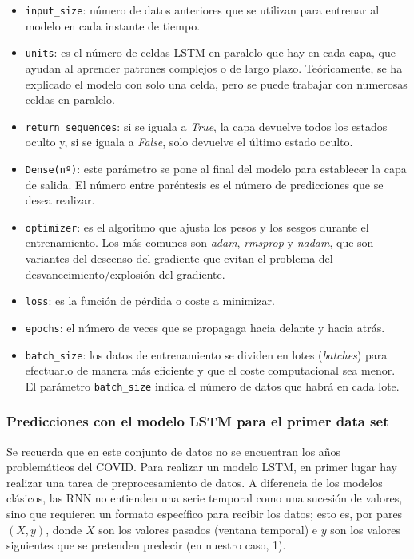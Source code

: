 \documentclass[12pt,twoside]{article}
\begin{document}
\begin{itemize}
    \item \texttt{input\_size}: número de datos anteriores que se utilizan para entrenar al modelo en cada instante de tiempo.
    \item \texttt{units}: es el número de celdas LSTM en paralelo que hay en cada capa, que ayudan al aprender patrones complejos o de largo plazo. Teóricamente, se ha explicado el modelo con solo una celda, pero se puede trabajar con numerosas celdas en paralelo.
    \item \texttt{return\_sequences}: si se iguala a \textit{True}, la capa devuelve todos los estados oculto y, si se iguala a \textit{False}, solo devuelve el último estado oculto.
    \item \texttt{Dense(nº)}: este parámetro se pone al final del modelo para establecer la capa de salida. El número entre paréntesis es el número de predicciones que se desea realizar.
    \item \texttt{optimizer}: es el algoritmo que ajusta los pesos y los sesgos durante el entrenamiento. Los más comunes son \textit{adam}, \textit{rmsprop} y \textit{nadam}, que son variantes del descenso del gradiente que evitan el problema del desvanecimiento/explosión del gradiente.
    \item \texttt{loss}: es la función de pérdida o coste a minimizar.
    \item \texttt{epochs}: el número de veces que se propagaga hacia delante y hacia atrás.
    \item \texttt{batch\_size}: los datos de entrenamiento se dividen en lotes (\textit{batches}) para efectuarlo de manera más eficiente y que el coste computacional sea menor. El parámetro \texttt{batch\_size} indica el número de datos que habrá en cada lote.
\end{itemize}

\subsubsection{Predicciones con el modelo LSTM para el primer data set}\label{sec:19}

Se recuerda que en este conjunto de datos no se encuentran los años problemáticos del COVID. Para realizar un modelo LSTM, en primer lugar hay realizar una tarea de preprocesamiento de datos. A diferencia de los modelos clásicos, las RNN no entienden una serie temporal como una sucesión de valores, sino que requieren un formato específico para recibir los datos; esto es, por pares $(X,y)$, donde $X$ son los valores pasados (ventana temporal) e $y$ son los valores siguientes que se pretenden predecir (en nuestro caso, 1).
\end{document}
